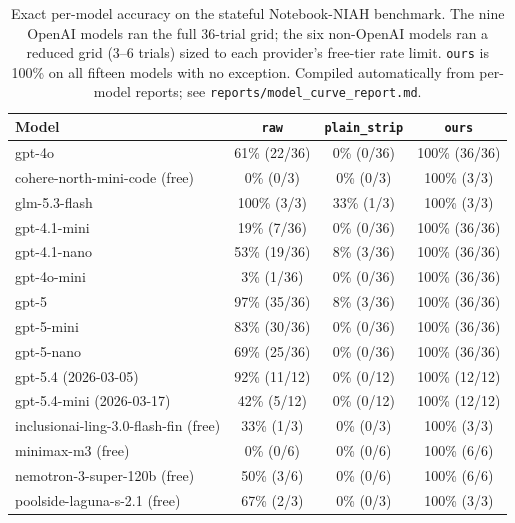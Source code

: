 \documentclass[11pt]{article}
\begin{document}
\begin{table}[t]
\centering\small
\begin{tabular}{@{}lccc@{}}
\toprule
Model & \texttt{raw} & \texttt{plain\_strip} & \texttt{ours} \\
\midrule
gpt-4o & 61\% (22/36) & 0\% (0/36) & 100\% (36/36) \\
cohere-north-mini-code (free) & 0\% (0/3) & 0\% (0/3) & 100\% (3/3) \\
glm-5.3-flash & 100\% (3/3) & 33\% (1/3) & 100\% (3/3) \\
gpt-4.1-mini & 19\% (7/36) & 0\% (0/36) & 100\% (36/36) \\
gpt-4.1-nano & 53\% (19/36) & 8\% (3/36) & 100\% (36/36) \\
gpt-4o-mini & 3\% (1/36) & 0\% (0/36) & 100\% (36/36) \\
gpt-5 & 97\% (35/36) & 8\% (3/36) & 100\% (36/36) \\
gpt-5-mini & 83\% (30/36) & 0\% (0/36) & 100\% (36/36) \\
gpt-5-nano & 69\% (25/36) & 0\% (0/36) & 100\% (36/36) \\
gpt-5.4 (2026-03-05) & 92\% (11/12) & 0\% (0/12) & 100\% (12/12) \\
gpt-5.4-mini (2026-03-17) & 42\% (5/12) & 0\% (0/12) & 100\% (12/12) \\
inclusionai-ling-3.0-flash-fin (free) & 33\% (1/3) & 0\% (0/3) & 100\% (3/3) \\
minimax-m3 (free) & 0\% (0/6) & 0\% (0/6) & 100\% (6/6) \\
nemotron-3-super-120b (free) & 50\% (3/6) & 0\% (0/6) & 100\% (6/6) \\
poolside-laguna-s-2.1 (free) & 67\% (2/3) & 0\% (0/3) & 100\% (3/3) \\
\bottomrule
\end{tabular}
\caption{Exact per-model accuracy on the stateful Notebook-NIAH benchmark.
The nine OpenAI models ran the full 36-trial grid; the six non-OpenAI
models ran a reduced grid (3--6 trials) sized to each provider's free-tier
rate limit. \texttt{ours} is 100\% on all fifteen models with no
exception. Compiled automatically from per-model reports; see
\texttt{reports/model\_curve\_report.md}.}
\label{tab:modelcurve}
\end{table}
\end{document}
